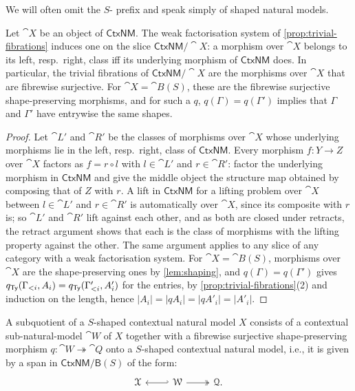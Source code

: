 \begin{remark}
    We will often omit the $S$- prefix and speak simply of shaped natural models.
\end{remark}

\begin{lemma}\label{lem:shaped-fiberwise-surjection}
    Let $\cat{X}$ be an object of $\mathsf{CtxNM}$. The weak factorisation system of \cref{prop:trivial-fibrations} induces one on the slice $\mathsf{CtxNM}/\cat{X}$: a morphism over $\cat{X}$ belongs to its left, resp.\ right, class iff its underlying morphism of $\mathsf{CtxNM}$ does. In particular, the trivial fibrations of $\mathsf{CtxNM}/\cat{X}$ are the morphisms over $\cat{X}$ that are fibrewise surjective. For $\cat{X} = \cat{B}(S)$, these are the fibrewise surjective shape-preserving morphisms, and for such a $q$, $q(\Gamma) = q(\Gamma')$ implies that $\Gamma$ and $\Gamma'$ have entrywise the same shapes.
\end{lemma}

\begin{proof}
    Let $\cat{L}'$ and $\cat{R}'$ be the classes of morphisms over $\cat{X}$ whose underlying morphisms lie in the left, resp.\ right, class of $\mathsf{CtxNM}$. Every morphism $f : Y \to Z$ over $\cat{X}$ factors as $f = r \circ l$ with $l \in \cat{L}'$ and $r \in \cat{R}'$: factor the underlying morphism in $\mathsf{CtxNM}$ and give the middle object the structure map obtained by composing that of $Z$ with $r$. A lift in $\mathsf{CtxNM}$ for a lifting problem over $\cat{X}$ between $l \in \cat{L}'$ and $r \in \cat{R}'$ is automatically over $\cat{X}$, since its composite with $r$ is; so $\cat{L}'$ and $\cat{R}'$ lift against each other, and as both are closed under retracts, the retract argument shows that each is the class of morphisms with the lifting property against the other. The same argument applies to any slice of any category with a weak factorisation system. For $\cat{X} = \cat{B}(S)$, morphisms over $\cat{X}$ are the shape-preserving ones by \cref{lem:shaping}, and $q(\Gamma) = q(\Gamma')$ gives $q_{\mathsf{Ty}}(\Gamma_{<i}, A_i) = q_{\mathsf{Ty}}(\Gamma'_{<i}, A'_i)$ for the entries, by \cref{prop:trivial-fibrations}(2) and induction on the length, hence $|A_i| = |qA_i| = |qA'_i| = |A'_i|$.
\end{proof}

\begin{definition}\label{def:shaped-subquotient}
    A subquotient of a $S$-shaped contextual natural model $X$ consists of a contextual sub-natural-model $\cat{W}$ of $X$ together with a fibrewise surjective shape-preserving morphism $q : \cat{W} \twoheadrightarrow \cat{Q}$ onto a $S$-shaped contextual natural model, i.e., it is given by a span in $\mathsf{CtxNM}/\mathsf{B}(S)$ of the form:
    \[\begin{tikzcd}
    	{\cat{X}} & {\cat{W} } & {\cat{Q}.}
    	\arrow[hook', from=1-2, to=1-1]
    	\arrow[two heads, from=1-2, to=1-3]
    \end{tikzcd}\]
\end{definition}

